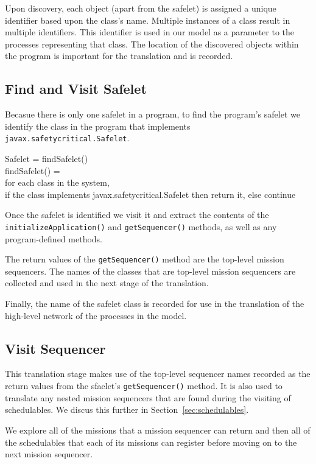 \documentclass[10pt,a4paper]{article}
\newenvironment{ttSection}{\ttfamily}{\par}
\begin{document}
Upon discovery, each object (apart from the safelet) is assigned a unique identifier based upon the class's name. Multiple instances of a class result in multiple identifiers. This identifier is used in our model as a parameter to the processes representing that class. The location of the discovered objects within the program is important for the translation and is recorded.

\subsection{Find and Visit Safelet}

Becasue there is only one safelet in a program, to find the program's safelet we identify the class in the program that implements \texttt{javax.safetycritical.Safelet}.

\begin{ttSection}
Safelet = findSafelet()\\

findSafelet() = \\
for each class in the system, \\
if the class implements javax.safetycritical.Safelet then return it, else continue
\end{ttSection}

Once the safelet is identified we visit it and extract the contents of the \texttt{initializeApplication()} and \texttt{getSequencer()} methods, as well as any program-defined methods. 

The return values of the \texttt{getSequencer()} method are the top-level mission sequencers. The names of the classes that are top-level mission sequencers are collected and used in the next stage of the translation. 

Finally, the name of the safelet class is recorded for use in the translation of the high-level network of the processes in the model.

\subsection{Visit Sequencer}
\label{sec:sequencer}
This translation stage makes use of the top-level sequencer names recorded as the return values from the sfaelet's \texttt{getSequencer()} method. It is also used to translate any nested mission sequencers that are found during the visiting of schedulables. We discus this further in Section~\ref{sec:schedulables}.

We explore all of the missions that a mission sequencer can return and then all of the schedulables that each of its missions can register before moving on to the next mission sequencer. 
\end{document}
